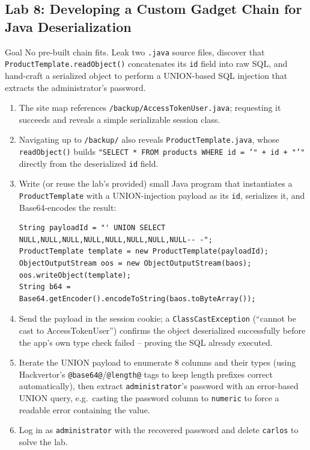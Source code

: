 \documentclass[11pt]{article}
\begin{document}
\subsection{Lab 8: Developing a Custom Gadget Chain for Java Deserialization}
\begin{labbox}{Goal}
No pre-built chain fits. Leak two \texttt{.java} source files, discover that \texttt{ProductTemplate.readObject()} concatenates its \texttt{id} field into raw SQL, and hand-craft a serialized object to perform a UNION-based SQL injection that extracts the administrator's password.
\end{labbox}
\begin{enumerate}
    \item The site map references \texttt{/backup/AccessTokenUser.java}; requesting it succeeds and reveals a simple serializable session class.
    \item Navigating up to \texttt{/backup/} also reveals \texttt{ProductTemplate.java}, whose \texttt{readObject()} builds \texttt{"SELECT * FROM products WHERE id = '" + id + "'"} directly from the deserialized \texttt{id} field.
    \item Write (or reuse the lab's provided) small Java program that instantiates a \texttt{ProductTemplate} with a UNION-injection payload as its \texttt{id}, serializes it, and Base64-encodes the result:
\begin{lstlisting}[style=code]
String payloadId = "' UNION SELECT NULL,NULL,NULL,NULL,NULL,NULL,NULL,NULL-- -";
ProductTemplate template = new ProductTemplate(payloadId);
ObjectOutputStream oos = new ObjectOutputStream(baos);
oos.writeObject(template);
String b64 = Base64.getEncoder().encodeToString(baos.toByteArray());
\end{lstlisting}
    \item Send the payload in the session cookie; a \texttt{ClassCastException} (``cannot be cast to AccessTokenUser'') confirms the object deserialized successfully before the app's own type check failed -- proving the SQL already executed.
    \item Iterate the UNION payload to enumerate 8 columns and their types (using Hackvertor's \verb|@base64@|/\verb|@length@| tags to keep length prefixes correct automatically), then extract \texttt{administrator}'s password with an error-based UNION query, e.g.\ casting the password column to \texttt{numeric} to force a readable error containing the value.
    \item Log in as \texttt{administrator} with the recovered password and delete \texttt{carlos} to solve the lab.
\end{enumerate}
\end{document}
